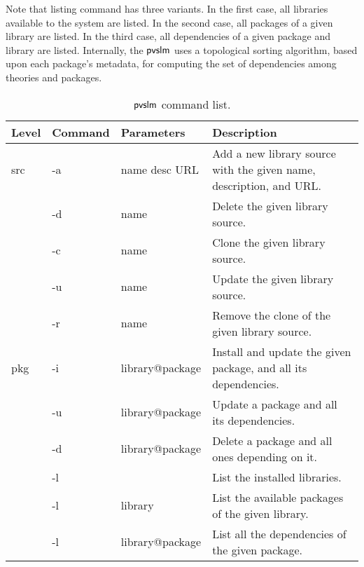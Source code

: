 Note that listing command has three variants. In the first case, all
libraries available to the system are listed. In the second case, all
packages of a given library are listed. In the third case, all
dependencies of a given package and library are listed. Internally,
the $\textsf{pvslm}$ uses a topological sorting algorithm, based upon each
package's metadata, for computing the set of dependencies among
theories and packages.

\begin{table*}[pthb]
  \begin{center}
    \begin{tabular}{ | l | l | l | p{6cm} | }
      \hline Level & Command & Parameters & Description \\ \hline
      src & -a          & name desc URL         & Add a new library source with the given name, description, and URL.                   \\ \cline{2-4}
          & -d          & name                  & Delete the given library source.                                          \\ \cline{2-4}
          & -c          & name                  & Clone the given library source.                          \\ \cline{2-4}
          & -u          & name                  & Update the given library source.                                \\ \cline{2-4}
          & -r          & name                  & Remove the clone of the given library source.                                                  \\ \hline
      pkg & -i          & library@package       & Install and update the given package, and all its dependencies.                \\ \cline{2-4}
          & -u          & library@package       & Update a package and all its dependencies.                   \\ \cline{2-4}
          & -d          & library@package       & Delete a  package and all ones depending on it.           \\ \cline{2-4}
          & -l          &                       & List the installed libraries.                                       \\ \cline{2-4}
          & -l          & library               & List the available packages of the given library.                         \\ \cline{2-4}
          & -l          & library@package       & List all the dependencies of the given package.                               \\ \hline
    \end{tabular}
  \end{center}
  \caption{$\textsf{pvslm}$ command list.}
  \label{tab.cmd}
\end{table*}

